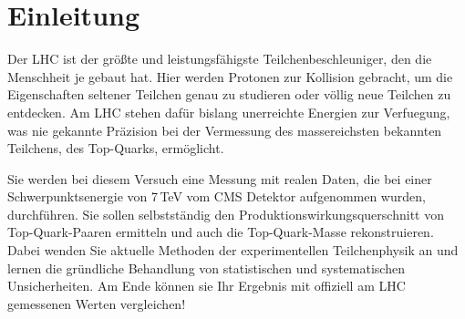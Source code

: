 \section{Einleitung}
\label{intro}

Der LHC ist der gr\"o\ss te und leistungsf\"ahigste Teilchenbeschleuniger, den die Menschheit je gebaut hat. Hier werden Protonen zur Kollision gebracht, um die Eigenschaften seltener Teilchen genau zu studieren oder v\"ollig neue Teilchen zu entdecken. Am LHC stehen daf\"ur bislang unerreichte Energien zur Verfuegung, was nie gekannte Pr\"azision bei der Vermessung des massereichsten bekannten Teilchens, des Top-Quarks, erm\"oglicht. 

Sie werden bei diesem Versuch eine Messung mit realen Daten, die bei einer Schwerpunktsenergie von 7\,TeV vom CMS Detektor aufgenommen wurden, durchf\"uhren. Sie sollen selbstst\"andig den Produktionswirkungsquerschnitt von Top-Quark-Paaren ermitteln und auch die Top-Quark-Masse rekonstruieren. Dabei wenden Sie aktuelle Methoden der experimentellen Teilchenphysik an und lernen die gr\"undliche Behandlung von statistischen und systematischen Unsicherheiten. Am Ende k\"onnen sie Ihr Ergebnis mit offiziell am LHC gemessenen Werten vergleichen!

